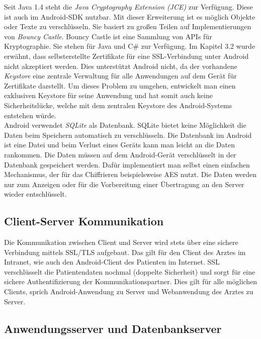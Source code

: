  Seit Java 1.4 steht die \emph{Java Cryptography Extension (JCE)}\cite[S. 352]{Android:02} zur Verf\"ugung.
 Diese ist auch im Android-SDK nutzbar.
 Mit dieser Erweiterung ist es m\"oglich Objekte oder Texte zu verschl\"usseln.
 Sie basiert zu gro\ss{}en Teilen auf Implementierungen von \emph{Bouncy Castle}\cite{Sicherheit:06}.
 Bouncy Castle ist eine Sammlung von APIs f\"ur Kryptographie.
 Sie stehen f\"ur Java und C\# zur Verf\"ugung.
 Im Kapitel 3.2 wurde erw\"ahnt, dass selbsterstellte Zertifikate f\"ur eine SSL-Verbindung unter Android nicht akzeptiert werden.
 Dies unterst\"utzt Android nicht, 
 da der vorhandene \emph{Keystore} eine zentrale Verwaltung f\"ur alle Anwendungen auf dem Ger\"at f\"ur Zertifikate darstellt. 
 Um dieses Problem zu umgehen, entwickelt man einen exklusiven Keystore f\"ur seine Anwendung und hat somit auch keine Sicherheitsl\"ucke, welche mit dem
 zentralen Keystore des Android-Systems entstehen w\"urde.\\
 Android verwendet \emph{SQLite} als Datenbank.
 SQLite bietet keine M\"oglichkeit die Daten beim Speichern automatisch zu verschl\"usseln\cite[S. 352]{Android:02}.
 Die Datenbank im Android ist eine Datei und beim Verlust eines Ger\"ats kann man leicht an die Daten rankommen.
 Die Daten m\"ussen auf dem Android-Ger\"at verschl\"usselt in der Datenbank gespeichert werden.
 Daf\"ur implementiert man selbst einen einfachen Mechanismus, der f\"ur das Chiffrieren beispielsweise AES nutzt.
 Die Daten werden nur zum Anzeigen oder f\"ur die Vorbereitung einer \"Ubertragung an den Server wieder entschl\"usselt\cite[S. 368]{Android:02}.\\
 

\subsection{Client-Server Kommunikation}

Die Kommunikation zwischen Client und Server wird stets \"uber eine sichere Verbindung mittels SSL/TLS aufgebaut.
Das gilt f\"ur den Client des Arztes im Intranet, wie auch den Android-Client des Patienten im Internet.
SSL verschl\"usselt die Patientendaten nochmal (doppelte Sicherheit) und sorgt f\"ur eine sichere Authentifizierung der Kommunikationspartner.
Dies gilt f\"ur alle m\"oglichen Clients, sprich Android-Anwendung zu Server und Webanwendung des Arztes zu Server.\\

\subsection{Anwendungsserver und Datenbankserver}

